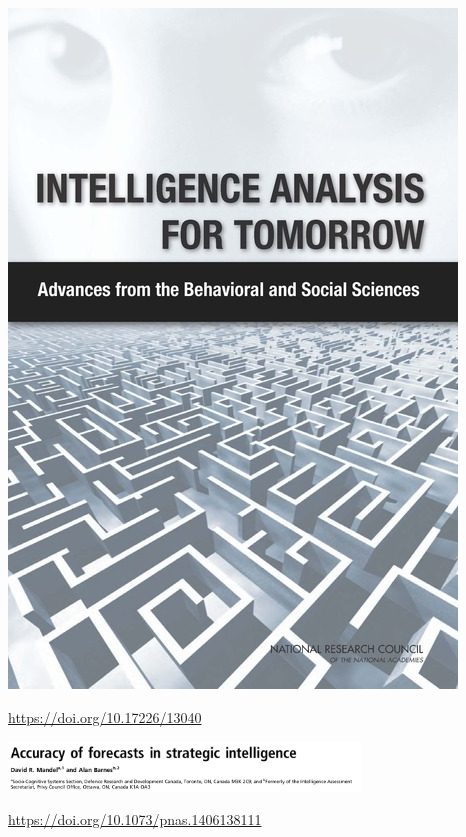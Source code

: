 \documentclass{beamer}
\begin{document}
\begin{frame}

\begin{center}
\includegraphics[height=0.7\textheight]{figures/nas_intellegence_2011_cover}
\end{center}

\vfill
\url{https://doi.org/10.17226/13040}

\end{frame}
\begin{frame}

\begin{center}
\includegraphics[width=0.7\textwidth]{figures/mandel_accuracy_2014_title}
\end{center}

\vfill
\url{https://doi.org/10.1073/pnas.1406138111}

\end{frame}
\end{document}
